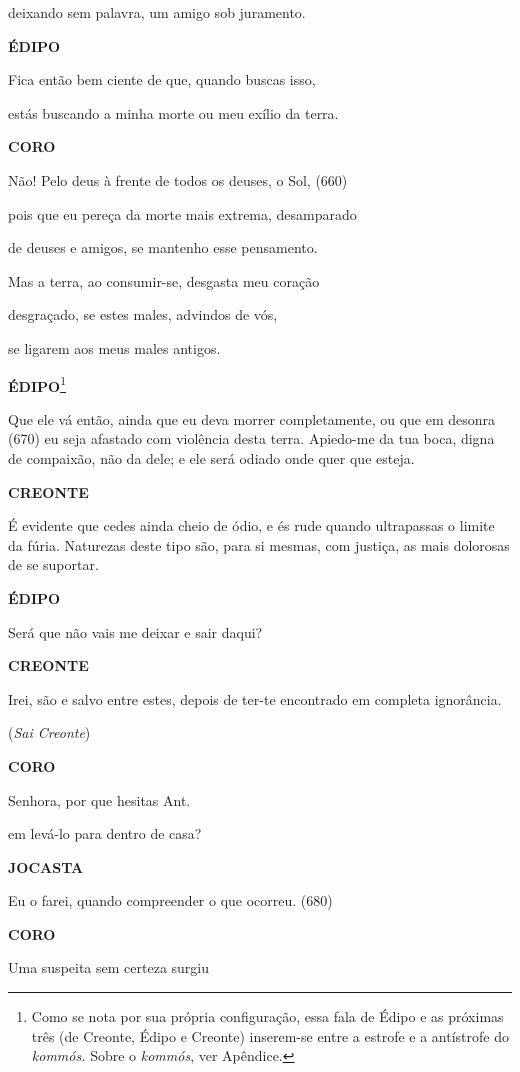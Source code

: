 deixando sem palavra, um amigo sob juramento.

\textbf{ÉDIPO}

Fica então bem ciente de que, quando buscas isso,

estás buscando a minha morte ou meu exílio da terra.

\textbf{CORO}

Não! Pelo deus à frente de todos os deuses, o Sol, (660)

pois que eu pereça da morte mais extrema, desamparado

de deuses e amigos, se mantenho esse pensamento.

Mas a terra, ao consumir-se, desgasta meu coração

desgraçado, se estes males, advindos de vós,

se ligarem aos meus males antigos.

\textbf{ÉDIPO}\footnote{Como se nota por sua própria configuração, essa
  fala de Édipo e as próximas três (de Creonte, Édipo e Creonte)
  inserem-se entre a estrofe e a antístrofe do \emph{kommós.} Sobre o
  \emph{kommós}, ver Apêndice.}

Que ele vá então, ainda que eu deva morrer completamente, ou que em
desonra (670) eu seja afastado com violência desta terra. Apiedo-me da
tua boca, digna de compaixão, não da dele; e ele será odiado onde quer
que esteja.

\textbf{CREONTE}

É evidente que cedes ainda cheio de ódio, e és rude quando ultrapassas o
limite da fúria. Naturezas deste tipo são, para si mesmas, com justiça,
as mais dolorosas de se suportar.

\textbf{ÉDIPO}

Será que não vais me deixar e sair daqui?

\textbf{CREONTE}

Irei, são e salvo entre estes, depois de ter-te encontrado em completa
ignorância.

(\emph{Sai Creonte})

\textbf{CORO }

Senhora, por que hesitas Ant.

em levá-lo para dentro de casa?

\textbf{JOCASTA}

Eu o farei, quando compreender o que ocorreu. (680)

\textbf{CORO}

Uma suspeita sem certeza surgiu

